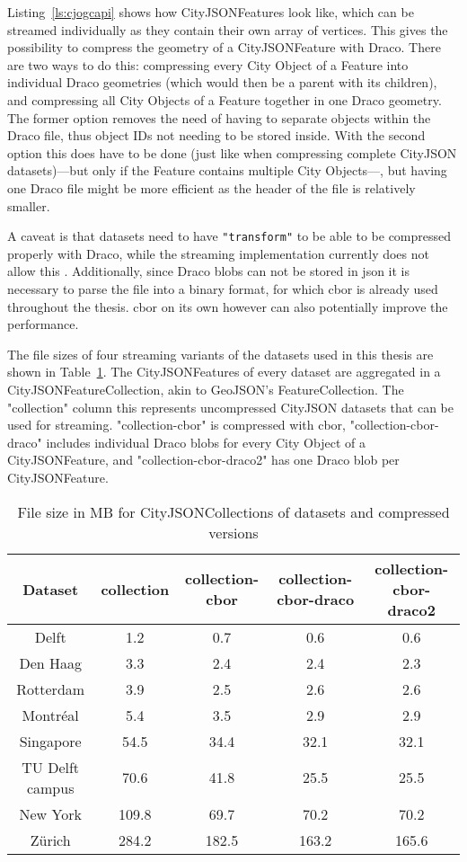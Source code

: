 Listing~\ref{ls:cjogcapi} shows how CityJSONFeatures look like, which can be streamed individually as they contain their own array of vertices.
This gives the possibility to compress the geometry of a CityJSONFeature with Draco.
There are two ways to do this: compressing every City Object of a Feature into individual Draco geometries (which would then be a parent with its children), and compressing all City Objects of a Feature together in one Draco geometry.
The former option removes the need of having to separate objects within the Draco file, thus object IDs not needing to be stored inside.
With the second option this does have to be done (just like when compressing complete CityJSON datasets)---but only if the Feature contains multiple City Objects---, but having one Draco file might be more efficient as the header of the file is relatively smaller.

A caveat is that datasets need to have \texttt{"transform"} to be able to be compressed properly with Draco, while the streaming implementation currently does not allow this \citet{Ledoux2020}.
Additionally, since Draco \ac{blob}s can not be stored in \ac{json} it is necessary to parse the file into a binary format, for which \ac{cbor} is already used throughout the thesis.
\ac{cbor} on its own however can also potentially improve the performance.

The file sizes of four streaming variants of the datasets used in this thesis are shown in Table~\ref{tab:streamingcompression}.
The CityJSONFeatures of every dataset are aggregated in a CityJSONFeatureCollection, akin to GeoJSON's FeatureCollection.
The "collection" column this represents uncompressed CityJSON datasets that can be used for streaming.
"collection-cbor" is compressed with \ac{cbor}, "collection-cbor-draco" includes individual Draco \ac{blob}s for every City Object of a CityJSONFeature, and "collection-cbor-draco2" has one Draco \ac{blob} per CityJSONFeature.

\begin{table}[h!]
\begin{center}
 \begin{tabular}{ |c ||c|c|c|c|} 
 \hline
  Dataset & collection & collection-cbor & collection-cbor-draco & collection-cbor-draco2 \\ 
 \hline \hline
 Delft & 1.2 & 0.7 & 0.6 & 0.6 \\
 \hline
 Den Haag & 3.3 & 2.4 & 2.4 & 2.3 \\ 
 \hline
 Rotterdam & 3.9 & 2.5 & 2.6 & 2.6 \\
 \hline
 Montréal & 5.4 & 3.5 & 2.9 & 2.9 \\
 \hline
 Singapore & 54.5 & 34.4 & 32.1 & 32.1 \\
 \hline
   TU Delft campus & 70.6 & 41.8 & 25.5 & 25.5 \\
 \hline
 New York & 109.8 & 69.7 & 70.2 & 70.2 \\
 \hline
 Zürich & 284.2 & 182.5 & 163.2 & 165.6 \\
 \hline
\end{tabular}
\caption{File size in MB for CityJSONCollections of datasets and compressed versions}
\label{tab:streamingcompression}
\end{center}
\end{table}

